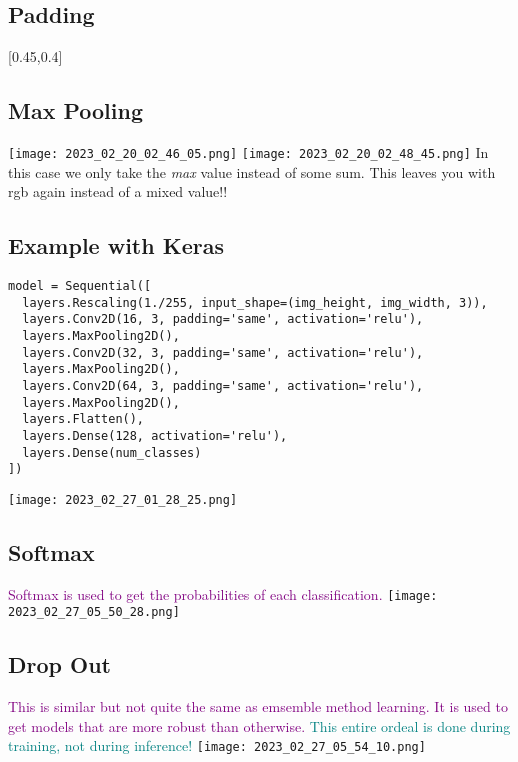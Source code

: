\documentclass[main.tex,fontsize=8pt,paper=a4,paper=portrait,DIV=calc,]{scrartcl}
\begin{document}
\subsection{Padding}
[0.45,0.4]

\subsection{Max Pooling}
\texttt{[image: 2023\_02\_20\_02\_46\_05.png]}\newline
\texttt{[image: 2023\_02\_20\_02\_48\_45.png]}\newline
In this case we only take the \emph{max} value instead of some sum.\newline
This leaves you with rgb again instead of a mixed value!!

\subsection{Example with Keras}
\begin{lstlisting}
model = Sequential([
  layers.Rescaling(1./255, input_shape=(img_height, img_width, 3)),
  layers.Conv2D(16, 3, padding='same', activation='relu'),
  layers.MaxPooling2D(),
  layers.Conv2D(32, 3, padding='same', activation='relu'),
  layers.MaxPooling2D(),
  layers.Conv2D(64, 3, padding='same', activation='relu'),
  layers.MaxPooling2D(),
  layers.Flatten(),
  layers.Dense(128, activation='relu'),
  layers.Dense(num_classes)
])
\end{lstlisting}
\texttt{[image: 2023\_02\_27\_01\_28\_25.png]}

\subsection{Softmax}
\textcolor{purple}{Softmax is used to get the probabilities of each classification.}
\texttt{[image: 2023\_02\_27\_05\_50\_28.png]}

\subsection{Drop Out}
\textcolor{purple}{This is similar but not quite the same as emsemble method learning.\newline
It is used to get models that are more robust than otherwise.}\newline
\textcolor{teal}{This entire ordeal is done during training, not during inference!}
\texttt{[image: 2023\_02\_27\_05\_54\_10.png]}
\end{document}
